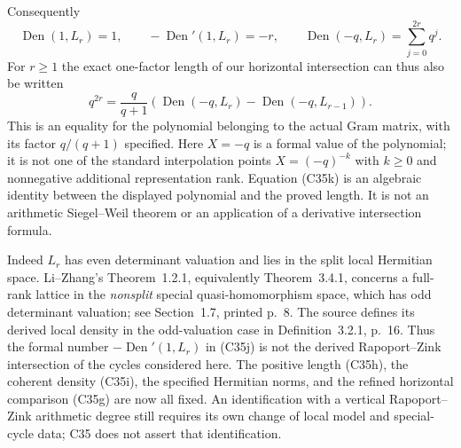 Consequently
\[
 \operatorname{Den}(1,L_r)=1,\qquad
 -\operatorname{Den}'(1,L_r)=-r,\qquad
 \operatorname{Den}(-q,L_r)=\sum_{j=0}^{2r}q^j.
 \tag{C35j}
\]
For $r\ge1$ the exact one-factor length of our horizontal
intersection can thus also be written
\[
 q^{2r}=
 \frac{q}{q+1}
 \left(\operatorname{Den}(-q,L_r)
               -\operatorname{Den}(-q,L_{r-1})\right).
 \tag{C35k}
\]
This is an equality for the polynomial belonging to the
actual Gram matrix, with its factor $q/(q+1)$ specified.
Here $X=-q$ is a formal value of the polynomial; it is
not one of the standard interpolation points
$X=(-q)^{-k}$ with $k\geq0$ and nonnegative additional
representation rank. Equation (C35k) is an algebraic
identity between the displayed polynomial and the proved
length. It is not an arithmetic Siegel--Weil theorem or
an application of a derivative intersection formula.

Indeed $L_r$ has even determinant valuation and lies in
the split local Hermitian space. Li--Zhang's
Theorem~1.2.1, equivalently Theorem~3.4.1, concerns a
full-rank lattice in the \emph{nonsplit} special
quasi-homomorphism space, which has odd determinant
valuation; see Section~1.7, printed p.~8.
The source defines its derived local density in the
odd-valuation case in Definition~3.2.1, p.~16.
Thus the formal number $-\operatorname{Den}'(1,L_r)$
in (C35j) is not the derived Rapoport--Zink intersection
of the cycles considered here. The positive length
(C35h), the coherent density (C35i), the specified
Hermitian norms, and the refined horizontal comparison
(C35g) are now all fixed. An identification with a
vertical Rapoport--Zink arithmetic degree still requires
its own change of local model and special-cycle data;
C35 does not assert that identification.
